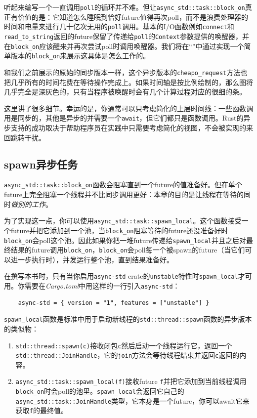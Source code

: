 听起来编写一个一直调用\texttt{poll}的循环并不难。但让\texttt{async\_std::task::block\_on}真正有价值的是：它知道怎么睡眠到恰好future值得再次poll，而不是浪费处理器的时间和电量来进行几十亿次无用的\texttt{poll}调用。基本的I/O函数例如\texttt{connect}和\texttt{read\_to\_string}返回的future保留了传递给\texttt{poll}的\texttt{Context}参数提供的唤醒器，并在\texttt{block\_on}应该醒来并再次尝试poll时调用唤醒器。我们将在“”中通过实现一个简单版本的\texttt{block\_on}来展示这具体是怎么工作的。

和我们之前展示的原始的同步版本一样，这个异步版本的\texttt{cheapo\_request}方法也把几乎所有的时间花费在等待操作完成上。如果时间轴是按比例绘制的，那么图将几乎完全是深灰色的，只有当程序被唤醒时会有几个计算过程对应的很细的条。

这里讲了很多细节。幸运的是，你通常可以只考虑简化的上层时间线：一些函数调用是同步的，其他是异步的并需要一个\texttt{await}，但它们都只是函数调用。Rust的异步支持的成功取决于帮助程序员在实践中只需要考虑简化的视图，不会被实现的来回跳转干扰。

\subsection{spawn异步任务}
\texttt{async\_std::task::block\_on}函数会阻塞直到一个future的值准备好。但在单个future上完全阻塞一个线程并不比同步调用更好：本章的目的是让线程在等待的同时\emph{做别的工作}。

为了实现这一点，你可以使用\texttt{async\_std::task::spawn\_local}。这个函数接受一个future并把它添加到一个池，当\texttt{block\_on}阻塞等待的future还没准备好时\texttt{block\_on}会poll这个池。因此如果你把一堆future传递给\texttt{spawn\_local}并且之后对最终结果的future调用\texttt{block\_on}，\texttt{block\_on}会poll每一个被spawn的future（当它们可以进一步执行时），并发运行整个池，直到结果准备好。

在撰写本书时，只有当你启用\texttt{async-std} crate的\texttt{unstable}特性时\texttt{spawn\_local}才可用。你需要在\emph{Cargo.toml}中用这样的一行引入\texttt{async-std}：
\begin{verbatim}
    async-std = { version = "1", features = ["unstable"] }
\end{verbatim}

\texttt{spawn\_local}函数是标准中用于启动新线程的\texttt{std::thread::spawn}函数的异步版本的类似物：
\begin{enumerate}
    \item \texttt{std::thread::spawn(c)}接收闭包\texttt{c}然后启动一个线程运行它，返回一个\texttt{std::thread::JoinHandle}，它的\texttt{join}方法会等待线程结束并返回\texttt{c}返回的内容。
    \item \texttt{async\_std::task::spawn\_local(f)}接收future \texttt{f}并把它添加到当前线程调用\texttt{block\_on}时会poll的池里。\texttt{spawn\_local}会返回它自己的\texttt{async\_std::task::JoinHandle}类型，它本身是一个future，你可以await它来获取\texttt{f}的最终值。
\end{enumerate}

